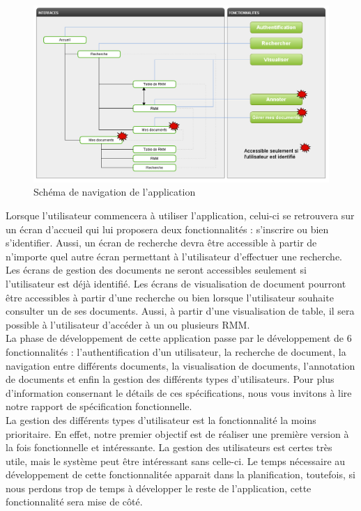 \documentclass[a4paper]{article}
\begin{document}
\begin{figure}[H]
\centering
\includegraphics[width=\textwidth]{navigation.png}
\caption{Schéma de navigation de l'application}
\label{fig:navigation}
\end{figure}

	Lorsque l’utilisateur commencera à utiliser l’application, celui-ci se retrouvera sur un écran d’accueil qui lui proposera deux fonctionnalités : s'inscrire ou bien s’identifier. Aussi, un écran de recherche devra être accessible à partir de n’importe quel autre écran permettant à l'utilisateur d'effectuer une recherche. Les écrans de gestion des documents ne seront accessibles seulement si l’utilisateur est déjà identifié. Les écrans de visualisation de document pourront être accessibles à partir d’une recherche ou bien lorsque l’utilisateur souhaite consulter un de ses documents. Aussi, à partir d’une visualisation de table, il sera possible à l’utilisateur d’accéder à un ou plusieurs RMM.\\
	
	La phase de développement de cette application passe par le développement de 6 fonctionnalités : l'authentification d'un utilisateur, la recherche de document, la navigation entre différents documents, la visualisation de documents, l'annotation de documents et enfin la gestion des différents types d'utilisateurs. Pour plus d'information consernant le détails de ces spécifications, nous vous invitons à lire notre rapport de spécification fonctionnelle.\\

	La gestion des différents types d'utilisateur est la fonctionnalité la moins prioritaire. En effet, notre premier objectif est de réaliser une première version à la fois fonctionnelle et intéressante. La gestion des utilisateurs est certes très utile, mais le système peut être intéressant sans celle-ci. Le temps nécessaire au développement de cette fonctionnalitée apparait dans la planification, toutefois, si nous perdons trop de temps à développer le reste de l'application, cette fonctionnalité sera mise de côté.\\
	
\end{document}
